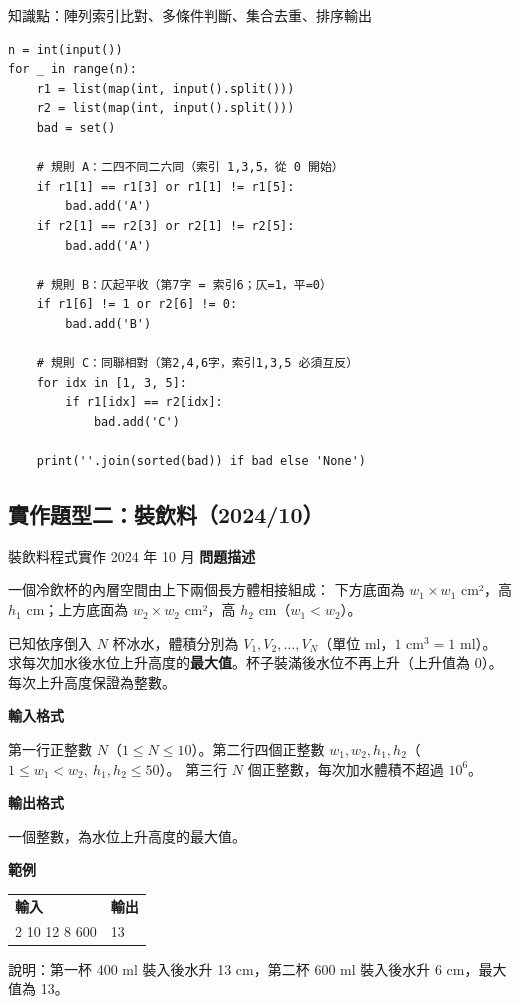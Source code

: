 \documentclass[12pt, a4paper]{ctexart}
\begin{document}
\medskip
知識點：陣列索引比對、多條件判斷、集合去重、排序輸出

\begin{verbatim}
n = int(input())
for _ in range(n):
    r1 = list(map(int, input().split()))
    r2 = list(map(int, input().split()))
    bad = set()

    # 規則 A：二四不同二六同（索引 1,3,5，從 0 開始）
    if r1[1] == r1[3] or r1[1] != r1[5]:
        bad.add('A')
    if r2[1] == r2[3] or r2[1] != r2[5]:
        bad.add('A')

    # 規則 B：仄起平收（第7字 = 索引6；仄=1，平=0）
    if r1[6] != 1 or r2[6] != 0:
        bad.add('B')

    # 規則 C：同聯相對（第2,4,6字，索引1,3,5 必須互反）
    for idx in [1, 3, 5]:
        if r1[idx] == r2[idx]:
            bad.add('C')

    print(''.join(sorted(bad)) if bad else 'None')
\end{verbatim}

\subsection{實作題型二：裝飲料（2024/10）}

\begin{problem}{裝飲料}{程式實作 2024 年 10 月}
\textbf{問題描述}

一個冷飲杯的內層空間由上下兩個長方體相接組成：
下方底面為 $w_1 \times w_1$ cm²，高 $h_1$ cm；上方底面為 $w_2 \times w_2$ cm²，高 $h_2$ cm（$w_1 < w_2$）。

已知依序倒入 $N$ 杯冰水，體積分別為 $V_1, V_2, \ldots, V_N$（單位 ml，$1\text{ cm}^3 = 1\text{ ml}$）。
求每次加水後水位上升高度的\textbf{最大值}。杯子裝滿後水位不再上升（上升值為 0）。
每次上升高度保證為整數。

\medskip
\textbf{輸入格式}

第一行正整數 $N$（$1 \le N \le 10$）。第二行四個正整數 $w_1,w_2,h_1,h_2$（$1 \le w_1 < w_2,\ h_1,h_2 \le 50$）。
第三行 $N$ 個正整數，每次加水體積不超過 $10^6$。

\textbf{輸出格式}

一個整數，為水位上升高度的最大值。

\medskip
\textbf{範例}

\begin{center}
\begin{tabular}{p{4cm} p{4cm}}
\small\textbf{輸入} & \small\textbf{輸出} \\[2pt]
\ttfamily\small
2 \newline
5 10 12 8 \newline
400 600
&
\ttfamily\small 13
\end{tabular}
\end{center}

說明：第一杯 400 ml 裝入後水升 13 cm，第二杯 600 ml 裝入後水升 6 cm，最大值為 13。
\end{problem}
\end{document}
